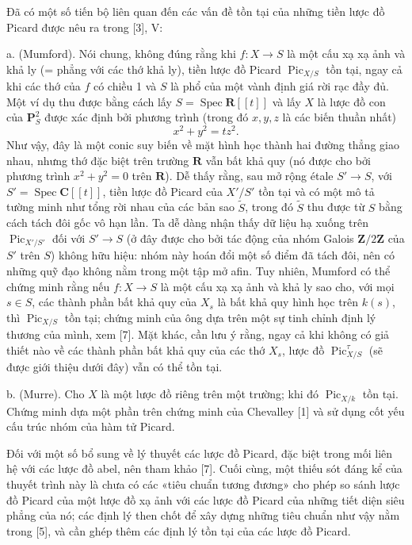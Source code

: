\documentclass[11pt,twoside,openany]{book}
\numberwithin{equation}{section}
\newcommand{\src}[1]{%
  \phantomsection\hypertarget{src:\fgasourceid:#1}{}%
  \marginpar{\raggedleft\footnotesize\sffamily #1}%
}
\newcommand{\fgasourceid}{unset}
\begin{document}
Đã có một số tiến bộ liên quan đến các vấn đề tồn tại của những tiền lược đồ
Picard được nêu ra trong [3], V:

\medskip
\noindent a. (Mumford). Nói chung, không đúng rằng khi
$f:X\longrightarrow S$ là một cấu xạ xạ ảnh và khả ly (= phẳng với các thớ
khả ly), tiền lược đồ Picard $\operatorname{Pic}_{X/S}$ tồn tại, ngay cả khi
các thớ của $f$ có chiều 1 và $S$ là phổ của một vành định giá rời rạc đầy đủ.
Một ví dụ thu được bằng cách lấy $S=\operatorname{Spec}\mathbf R[[t]]$ và lấy
$X$ là lược đồ con của $\mathbf P^2_S$ được xác định bởi phương trình (trong đó
$x,y,z$ là các biến thuần nhất)
\[
x^2+y^2=tz^2.
\]
Như vậy, đây là một conic suy biến về mặt hình học thành hai đường thẳng giao
nhau, nhưng thớ đặc biệt trên trường $\mathbf R$ vẫn bất khả quy (nó được cho
bởi phương trình $x^2+y^2=0$ trên $\mathbf R$). Dễ thấy rằng, sau mở rộng étale
$S'\longrightarrow S$, với $S'=\operatorname{Spec}\mathbf C[[t]]$, tiền lược
đồ Picard của $X'/S'$ tồn tại và có một mô tả tường minh như tổng rời nhau của
các bản sao $\widetilde S$, trong đó $\widetilde S$ thu được từ $S$ bằng
cách tách đôi gốc vô hạn lần. Ta dễ dàng nhận thấy dữ liệu hạ xuống trên
$\operatorname{Pic}_{X'/S'}$ đối với $S'\longrightarrow S$ (ở đây được cho
bởi tác động của nhóm Galois $\mathbf Z/2\mathbf Z$ của $S'$ trên $S$) không
hữu hiệu: nhóm này hoán đổi một số điểm đã tách đôi, nên có những quỹ đạo không
nằm trong một tập mở afin. Tuy nhiên, Mumford có thể chứng minh rằng nếu
$f:X\longrightarrow S$ là một cấu xạ xạ ảnh và khả ly sao cho, với mọi
$s\in S$, các thành phần bất khả quy của $X_s$ là bất khả quy hình học trên
$k(s)$, thì $\operatorname{Pic}_{X/S}$ tồn tại; chứng minh của ông dựa trên
một sự tinh chỉnh định lý thương của mình, xem [7]. Mặt khác, cần lưu ý rằng,
ngay cả khi không có giả thiết nào về các thành phần bất khả quy của các thớ
$X_s$, lược đồ $\operatorname{Pic}^{\tau}_{X/S}$ (sẽ được giới thiệu dưới
đây) vẫn có thể tồn tại.
\src{222}
\noindent b. (Murre). Cho $X$ là một lược đồ riêng trên một trường; khi đó
$\operatorname{Pic}_{X/k}$ tồn tại. Chứng minh dựa một phần trên chứng minh
của Chevalley [1] và sử dụng cốt yếu cấu trúc nhóm của hàm tử Picard.

Đối với một số bổ sung về lý thuyết các lược đồ Picard, đặc biệt trong mối
liên hệ với các lược đồ abel, nên tham khảo [7]. Cuối cùng, một thiếu sót đáng
kể của thuyết trình này là chưa có các «tiêu chuẩn tương đương» cho phép so
sánh lược đồ Picard của một lược đồ xạ ảnh với các lược đồ Picard của những
tiết diện siêu phẳng của nó; các định lý then chốt để xây dựng những tiêu
chuẩn như vậy nằm trong [5], và cần ghép thêm các định lý tồn tại của các
lược đồ Picard.
\end{document}

